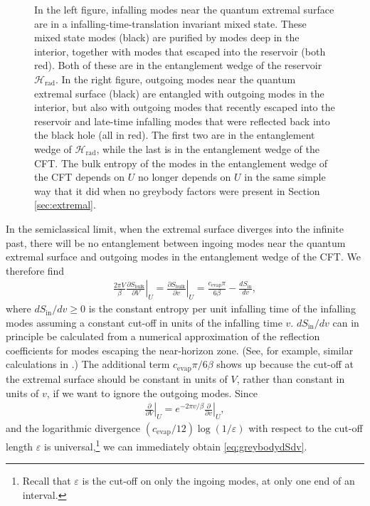 \documentclass[11pt,a4paper]{article}
\begin{document}
\begin{figure} [t]
\begin{subfigure}{.48\textwidth}
\end{subfigure}
\caption{In the left figure, infalling modes near the quantum extremal surface are in a infalling-time-translation invariant mixed state. These mixed state modes (black) are purified by modes deep in the interior, together with modes that escaped into the reservoir (both red). Both of these are in the entanglement wedge of the reservoir $\mathcal{H}_\text{rad}$. In the right figure, outgoing modes near the quantum extremal surface (black) are entangled with outgoing modes in the interior, but also with outgoing modes that recently escaped into the reservoir and late-time infalling modes that were reflected back into the black hole (all in red). The first two are in the entanglement wedge of $\mathcal{H}_\text{rad}$, while the last is in the entanglement wedge of the CFT. The bulk entropy of the modes in the entanglement wedge of the CFT depends on $U$ no longer depends on $U$ in the same simple way that it did when no greybody factors were present in Section \ref{sec:extremal}.}
\label{fig:reflected}
\end{figure}

In the semiclassical limit, when the extremal surface diverges into the infinite past, there will be no entanglement between ingoing modes near the quantum extremal surface and outgoing modes in the entanglement wedge of the CFT. We therefore find
\begin{align} \label{eq:greybodydSdv}
\frac{2 \pi V}{\beta}\left.\frac{\partial S_\text{bulk}}{\partial V}\right|_U = \left.\frac{\partial S_\text{bulk}}{\partial v}\right|_U = \frac{c_\text{evap} \pi}{6 \beta} - \frac{d S_\text{in}}{d v},
\end{align}
where $d S_\text{in} / d v \geq 0$ is the constant entropy per unit infalling time of the infalling modes assuming a constant cut-off in units of the infalling time $v$.  $d S_\text{in} / d v$ can in principle be calculated from a numerical approximation of the reflection coefficients for modes escaping the near-horizon zone. (See, for example, similar calculations in \cite{page1976particle}.) The additional term $c_\text{evap} \pi / 6 \beta$ shows up because the cut-off at the extremal surface should be constant in units of $V$, rather than constant in units of $v$, if we want to ignore the outgoing modes. Since
\begin{align}
\left.\frac{\partial}{\partial V}\right|_U = e^{-2 \pi v / \beta} \left.\frac{\partial}{\partial v}\right|_U,
\end{align}
and the logarithmic divergence $(c_\text{evap} / 12) \log(1/\varepsilon)$ with respect to the cut-off length $\varepsilon$ is universal,\footnote{Recall that $\varepsilon$ is the cut-off on only the ingoing modes, at only one end of an interval.} we can immediately obtain \eqref{eq:greybodydSdv}.
\end{document}
